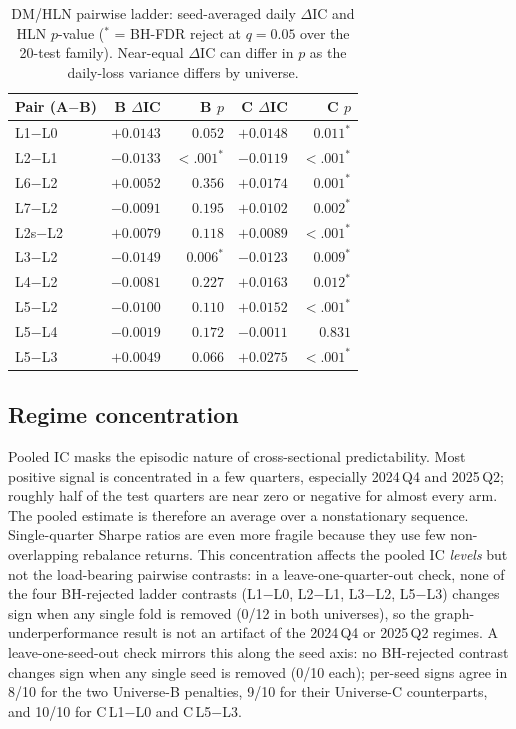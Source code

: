 \documentclass[sigconf,nonacm]{acmart}
\newcommand{\compacttable}{\scriptsize\setlength{\tabcolsep}{3pt}\renewcommand{\arraystretch}{0.88}}
\begin{document}
\begin{table}[t]
  \centering
  \caption{DM/HLN pairwise ladder: seed-averaged daily $\Delta$IC and HLN $p$-value ($^\ast$ = BH-FDR reject at $q=0.05$ over the 20-test family). Near-equal $\Delta$IC can differ in $p$ as the daily-loss variance differs by universe.}
  \label{tab:dm}
  \compacttable
  \begin{tabular}{@{}l rr rr@{}}
    \toprule
    Pair (A$-$B) & B $\Delta$IC & B $p$ & C $\Delta$IC & C $p$ \\
    \midrule
    L1$-$L0 & $+0.0143$ & $0.052$ & $+0.0148$ & $0.011^\ast$ \\
    L2$-$L1 & $-0.0133$ & $<.001^\ast$ & $-0.0119$ & $<.001^\ast$ \\
    L6$-$L2 & $+0.0052$ & $0.356$ & $+0.0174$ & $0.001^\ast$ \\
    L7$-$L2 & $-0.0091$ & $0.195$ & $+0.0102$ & $0.002^\ast$ \\
    L2s$-$L2& $+0.0079$ & $0.118$ & $+0.0089$ & $<.001^\ast$ \\
    L3$-$L2 & $-0.0149$ & $0.006^\ast$ & $-0.0123$ & $0.009^\ast$ \\
    L4$-$L2 & $-0.0081$ & $0.227$ & $+0.0163$ & $0.012^\ast$ \\
    L5$-$L2 & $-0.0100$ & $0.110$ & $+0.0152$ & $<.001^\ast$ \\
    L5$-$L4 & $-0.0019$ & $0.172$ & $-0.0011$ & $0.831$ \\
    L5$-$L3 & $+0.0049$ & $0.066$ & $+0.0275$ & $<.001^\ast$ \\
    \bottomrule
  \end{tabular}
\end{table}

\subsection{Regime concentration}\label{sec:regime}
Pooled IC masks the episodic nature of cross-sectional predictability. Most positive signal is concentrated in a few quarters, especially 2024\,Q4 and 2025\,Q2; roughly half of the test quarters are near zero or negative for almost every arm. The pooled estimate is therefore an average over a nonstationary sequence. Single-quarter Sharpe ratios are even more fragile because they use few non-overlapping rebalance returns. This concentration affects the pooled IC \emph{levels} but not the load-bearing pairwise contrasts: in a leave-one-quarter-out check, none of the four BH-rejected ladder contrasts (L1$-$L0, L2$-$L1, L3$-$L2, L5$-$L3) changes sign when any single fold is removed (0/12 in both universes), so the graph-underperformance result is not an artifact of the 2024\,Q4 or 2025\,Q2 regimes. A leave-one-seed-out check mirrors this along the seed axis: no BH-rejected contrast changes sign when any single seed is removed (0/10 each); per-seed signs agree in 8/10 for the two Universe-B penalties, 9/10 for their Universe-C counterparts, and 10/10 for C\,L1$-$L0 and C\,L5$-$L3.
\end{document}
